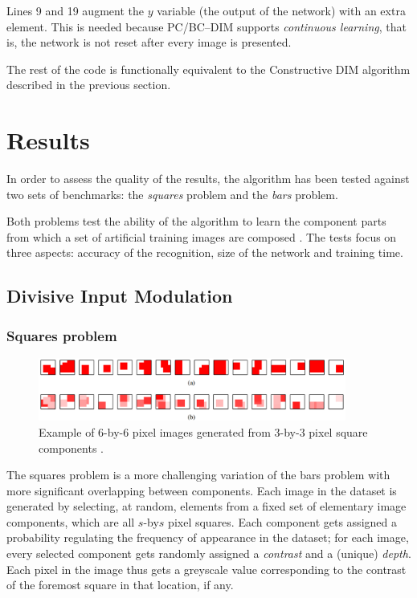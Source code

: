 \documentclass[11pt,a4paper]{report}
\begin{document}
				Lines 9 and 19 augment the $y$ variable (the output of the network) with an extra element. This is needed because PC/BC--DIM supports \emph{continuous learning}, that is, the network is not reset after every image is presented.
				
				The rest of the code is functionally equivalent to the Constructive DIM algorithm described in the previous section.
			
		\section{Results}
			In order to assess the quality of the results, the algorithm has been tested against two sets of benchmarks: the \emph{squares} problem and the \emph{bars} problem.
			
			Both problems test the ability of the algorithm to learn the component parts from which a set of artificial training images are composed \cite{spratling2009unsupervised,spratling2012unsupervised}. The tests focus on three aspects: accuracy of the recognition, size of the network and training time.
			
			\subsection{Divisive Input Modulation}
				\subsubsection{Squares problem}
				\begin{figure}[h]
					\centering
					\includegraphics[width=0.9\textwidth]{squares}
					\caption{Example of 6-by-6 pixel images generated from 3-by-3 pixel square components \cite{spratling2009unsupervised}.}
					\label{fig:squares}
				\end{figure}
				The squares problem is a more challenging variation of the bars problem with more significant overlapping between components. Each image in the dataset is generated by selecting, at random, elements from a fixed set of elementary image components, which are all $s$-by$s$ pixel squares. Each component gets assigned a probability regulating the frequency of appearance in the dataset; for each image, every selected component gets randomly assigned a \emph{contrast} and a (unique) \emph{depth}. Each pixel in the image thus gets a greyscale value corresponding to the contrast of the foremost square in that location, if any.
				
\end{document}
